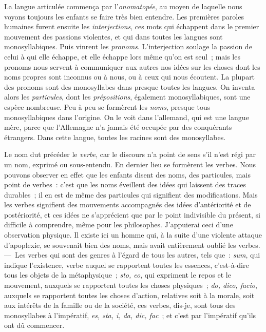 \documentclass[french,twoside]{book} %
\begin{document}
La langue articulée commença par l’{\itshape onomatopée}, au moyen de laquelle nous voyons toujours les enfants se faire très bien entendre. Les premières paroles humaines furent ensuite les {\itshape interjections}, ces mots qui échappent dans le premier mouvement des passions violentes, et qui dans toutes les langues sont monosyllabiques. Puis vinrent les {\itshape pronoms}. L’interjection soulage la passion de celui à qui elle échappe, et elle échappe lors même qu’on est seul ; mais les pronoms nous servent à communiquer aux autres nos idées sur les choses dont les noms propres sont inconnus ou à nous, ou à ceux qui nous écoutent. La plupart des pronoms sont des monosyllabes dans presque toutes les langues. On inventa alors les {\itshape particules}, dont les {\itshape prépositions}, également monosyllabiques, sont une espèce nombreuse. Peu à peu se formèrent les {\itshape noms}, presque tous monosyllabiques dans l’origine. On le voit dans l’allemand, qui est une langue mère, parce que l’Allemagne n’a jamais été occupée par des conquérants étrangers.  Dans cette langue, toutes les racines sont des monosyllabes.\par
Le nom dut précéder le {\itshape verbe}, car le discours n’a point de sens s’il n’est régi par un nom, exprimé ou sous-entendu. En dernier lieu se formèrent les verbes. Nous pouvons observer en effet que les enfants disent des noms, des particules, mais point de verbes : c’est que les noms éveillent des idées qui laissent des traces durables ; il en est de même des particules qui signifient des modifications. Mais les verbes signifient des mouvements accompagnés des idées d’antériorité et de postériorité, et ces idées ne s’apprécient que par le point indivisible du présent, si difficile à comprendre, même pour les philosophes. J’appuierai ceci d’une observation physique. Il existe ici un homme qui, à la suite d’une violente attaque d’apoplexie, se souvenait bien des noms, mais avait entièrement oublié les verbes. — Les verbes qui sont des genres à l’égard de tous les autres, tels que : {\itshape sum}, qui indique l’existence, verbe auquel se rapportent toutes les essences, c’est-à-dire tous les objets de la métaphysique ; {\itshape sto, eo}, qui expriment le repos et le mouvement, auxquels se rapportent toutes les choses physiques ; {\itshape do, dico, facio}, auxquels se rapportent toutes les choses d’action, relatives soit à la morale, soit aux intérêts de la famille ou de la société, ces verbes, dis-je, sont tous des monosyllabes à l’impératif, {\itshape es, sta, i, da, dic, fac} ; et c’est par l’impératif qu’ils ont dû commencer.\par
\end{document}
